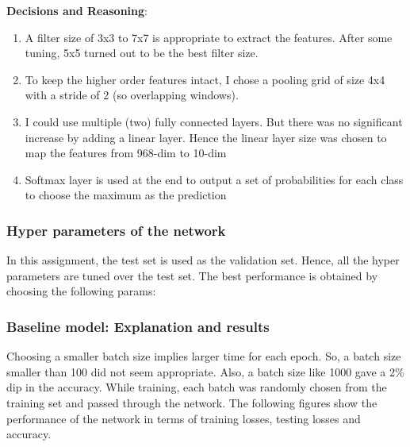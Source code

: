 \documentclass[a4paper]{article}
\begin{document}
\textbf{Decisions and Reasoning}:
\begin{enumerate}
    \item A filter size of 3x3 to 7x7 is appropriate to extract the features. After some tuning, 5x5 turned out to be the best filter size.
    \item To keep the higher order features intact, I chose a pooling grid of size 4x4 with a stride of 2 (so overlapping windows).
    \item I could use multiple (two) fully connected layers. But there was no significant increase by adding a linear layer. Hence the linear layer size was chosen to map the features from 968-dim to 10-dim
    \item Softmax layer is used at the end to output a set of probabilities for each class to choose the maximum as the prediction
\end{enumerate}

\subsubsection{Hyper parameters of the network}
In this assignment, the test set is used as the validation set. Hence, all the hyper parameters are tuned over the test set. The best performance is obtained by choosing the following params:\\


\subsubsection{Baseline model: Explanation and results}
Choosing a smaller batch size implies larger time for each epoch. So, a batch size smaller than 100 did not seem appropriate. Also, a batch size like 1000 gave a 2\% dip in the accuracy. While training, each batch was randomly chosen from the training set and passed through the network. The following figures show the performance of the network in terms of training losses, testing losses and accuracy.\\
\end{document}
